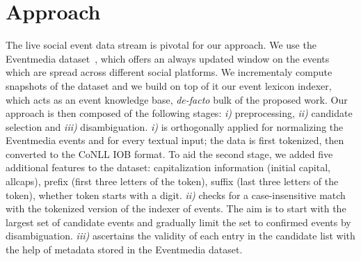 \documentclass[10pt,a4paper]{article}
\begin{document}
\section{Approach}
The live social event data stream is pivotal for our approach. We use the Eventmedia dataset~\cite{krouf2012}, which offers an always updated window on the events which are spread across different social platforms. We incrementaly compute snapshots of the dataset and we build on top of it our event lexicon indexer, which acts as an event knowledge base, \textit{de-facto} bulk of the proposed work. Our approach is then composed of the following stages: \textit{i)} preprocessing, \textit{ii)} candidate selection and \textit{iii)} disambiguation. \textit{i)} is orthogonally applied for normalizing the Eventmedia events and for every textual input; the data is first tokenized, then converted to the CoNLL IOB format. To aid the second stage, we added five additional features to the dataset: capitalization information (initial capital, allcaps), prefix (first three letters of the token), suffix (last three letters of the token), whether token starts with a digit.
\textit{ii)} checks for a case-insensitive match with the tokenized version of the indexer of events. 
The aim is to start with the largest set of candidate events and gradually limit the set to confirmed events by disambiguation. 
\textit{iii)} ascertains the validity of each entry in the candidate list with the help of metadata stored in the Eventmedia dataset. 
\end{document}
